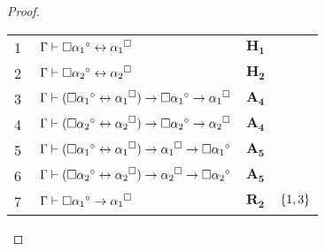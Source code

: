 \begin{tcolorbox}[enhanced jigsaw, breakable, sharp corners, colframe=black, colback=white, boxrule=0.5pt, left=1.5mm, right=1.5mm, top=1.5mm, bottom=1.5mm]
\begin{theorem}
\begin{proof}
        \vspace{.5\baselineskip}
        \footnotesize
        \setlength{\rowskip}{.5\baselineskip}
        \begin{xltabular}{\textwidth}{r | X l l}
            \scriptsize{\phantom{0}1}\phantom{ } & $\ \Gamma\vdash\nec{\alpha_1}^\circ\leftrightarrow{\alpha_1}^\medsquare$                                                                                                                                                      & $\mathbf{H_1}$\phantom{1}                & \\[\rowskip]
            \scriptsize{\phantom{0}2}\phantom{ } & $\ \Gamma\vdash\nec{\alpha_2}^\circ\leftrightarrow{\alpha_2}^\medsquare$                                                                                                                                                      & $\mathbf{H_2}$                           & \\[\rowskip]
            \scriptsize{\phantom{0}3}\phantom{ } & $\ \Gamma\vdash(\nec{\alpha_1}^\circ\leftrightarrow{\alpha_1}^\medsquare)\to\nec{\alpha_1}^\circ\to{\alpha_1}^\medsquare$                                                                                                     & $\hyperref[modal.axiom.4]{\mathbf{A_4}}$ & \\[\rowskip]
            \scriptsize{\phantom{0}4}\phantom{ } & $\ \Gamma\vdash(\nec{\alpha_2}^\circ\leftrightarrow{\alpha_2}^\medsquare)\to\nec{\alpha_2}^\circ\to{\alpha_2}^\medsquare$                                                                                                     & $\hyperref[modal.axiom.4]{\mathbf{A_4}}$ & \\[\rowskip]
            \scriptsize{\phantom{0}5}\phantom{ } & $\ \Gamma\vdash(\nec{\alpha_1}^\circ\leftrightarrow{\alpha_1}^\medsquare)\to{\alpha_1}^\medsquare \to \nec{\alpha_1}^\circ$                                                                                                   & $\hyperref[modal.axiom.5]{\mathbf{A_5}}$ & \\[\rowskip]
            \scriptsize{\phantom{0}6}\phantom{ } & $\ \Gamma\vdash(\nec{\alpha_2}^\circ\leftrightarrow{\alpha_2}^\medsquare)\to{\alpha_2}^\medsquare \to \nec{\alpha_2}^\circ$                                                                                                   & $\hyperref[modal.axiom.5]{\mathbf{A_5}}$ & \\[\rowskip]
            \scriptsize{\phantom{0}7}\phantom{ } & $\ \Gamma\vdash\nec{\alpha_1}^\circ\to{\alpha_1}^\medsquare$                                                                                                                                                                  & $\hyperref[modal.rule.2]{\mathbf{R_2}}$  & $\left\{1,3\right\}$\\[\rowskip]

\end{xltabular}
\end{proof}
\end{theorem}
\end{tcolorbox}
